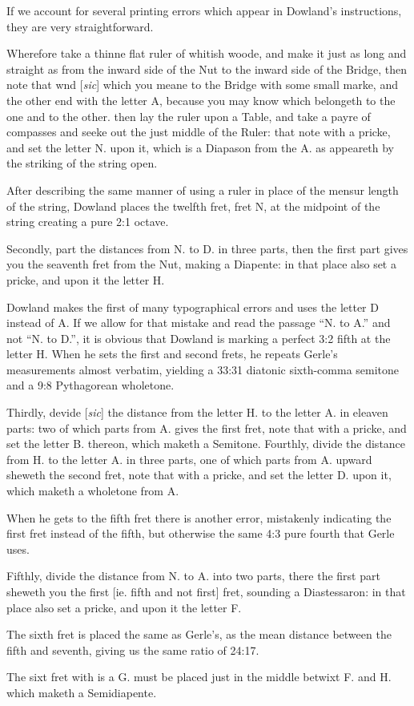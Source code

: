 If we account for several printing errors which appear in Dowland's instructions, they
are very straightforward.
\begin{blocks}
Wherefore take a thinne flat ruler of whitish woode, and make it just as long and
straight as from the inward side of the Nut to the inward side of the Bridge, then note
that wnd [\textit{sic}] which you meane to the Bridge with some small marke, and the other end with
the letter A, because you may know which belongeth to the one and to the other. then
lay the ruler upon a Table, and take a payre of compasses and seeke out the just middle
of the Ruler: that note with a pricke, and set the letter N. upon it, which is a
Diapason from the A. as appeareth by the striking of the string open.
\end{blocks}
After describing the same manner of using a ruler in place of the mensur length of the
string, Dowland places the twelfth fret, fret N, at the midpoint of the string creating
a pure 2:1 octave.
\begin{blocks}
Secondly, part the distances from N. to D. in three parts, then the first part gives
you the seaventh fret from the Nut, making a Diapente: in that place also set a pricke,
and upon it the letter H.
\end{blocks}
Dowland makes the first of many typographical errors and uses the letter D instead of
A. If we allow for that mistake and read the passage ``N. to A.'' and not ``N. to D.'', it
is obvious that Dowland is marking a perfect 3:2 fifth at the letter H. When he sets
the first and second frets, he repeats Gerle's measurements almost verbatim, yielding a
33:31 diatonic sixth-comma semitone and a 9:8 Pythagorean wholetone.
\begin{blocks}
Thirdly, devide [\textit{sic}] the distance from the letter H. to the letter A. in eleaven parts: two
of which parts from A. gives the first fret, note that with a pricke, and set the
letter B. thereon, which maketh a Semitone. Fourthly, divide the distance from H. to
the letter A. in three parts, one of which parts from A. upward sheweth the second
fret, note that with a pricke, and set the letter D. upon it, which maketh a wholetone
from A.
\end{blocks}
When he gets to the fifth fret there is another error, mistakenly indicating the first
fret instead of the fifth, but otherwise the same 4:3 pure fourth that Gerle uses.
\begin{blocks}
Fifthly, divide the distance from N. to A. into two parts, there the first part sheweth
you the first [ie. fifth and not first] fret, sounding a Diastessaron: in that place
also set a pricke, and upon it the letter F.
\end{blocks}
The sixth fret is placed the same as Gerle's, as the mean distance between the fifth and
seventh, giving us the same ratio of 24:17.
\begin{blocks}
The sixt fret with is a G. must be placed just in the middle betwixt F. and H. which
maketh a Semidiapente.
\end{blocks}

